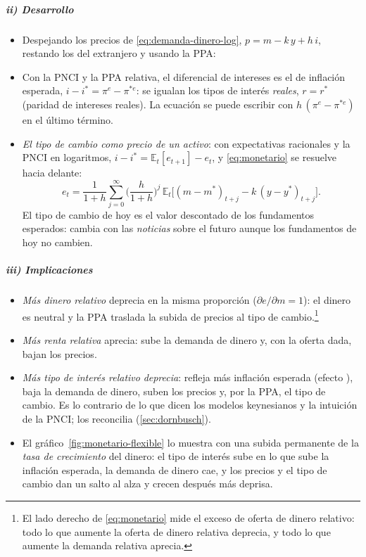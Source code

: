 \documentclass[11pt]{article}
\begin{document}
\subparagraph{ii) Desarrollo}
\begin{itemize}
\item Despejando los precios de \eqref{eq:demanda-dinero-log}, $p=m-k\,y+h\,i$, restando los del extranjero y usando la PPA:
\item Con la PNCI y la PPA relativa, el diferencial de intereses es el de inflación esperada, $i-i^*=\pi^e-\pi^{*e}$: se igualan los tipos de interés \emph{reales}, $r=r^*$ (paridad de intereses reales). La ecuación se puede escribir con $h\,(\pi^e-\pi^{*e})$ en el último término.
\item \emph{El tipo de cambio como precio de un activo}: con expectativas racionales  y la PNCI en logaritmos, $i-i^*=\mathbb{E}_t[e_{t+1}]-e_t$, y \eqref{eq:monetario} se resuelve hacia delante:
  \begin{equation}\label{eq:valor-presente}
  e_t=\frac{1}{1+h}\sum_{j=0}^{\infty}\Big(\frac{h}{1+h}\Big)^{j}\,\mathbb{E}_t\big[(m-m^*)_{t+j}-k\,(y-y^*)_{t+j}\big] .
  \end{equation}
  El tipo de cambio de hoy es el valor descontado de los fundamentos esperados: cambia con las \emph{noticias} sobre el futuro aunque los fundamentos de hoy no cambien\nocite{Mussa1976Exchange,Frenkel1981News}.
\end{itemize}

\subparagraph{iii) Implicaciones}
\begin{itemize}
\item \emph{Más dinero relativo} deprecia en la misma proporción ($\partial e/\partial m=1$): el dinero es neutral y la PPA traslada la subida de precios al tipo de cambio.\footnote{El lado derecho de \eqref{eq:monetario} mide el exceso de oferta de dinero relativo: todo lo que aumente la oferta de dinero relativa deprecia, y todo lo que aumente la demanda relativa aprecia.}
\item \emph{Más renta relativa} aprecia: sube la demanda de dinero y, con la oferta dada, bajan los precios.
\item \emph{Más tipo de interés relativo} \emph{deprecia}: refleja más inflación esperada (efecto ), baja la demanda de dinero, suben los precios y, por la PPA, el tipo de cambio. Es lo contrario de lo que dicen los modelos keynesianos y la intuición de la PNCI; \textcite{Frankel1979Mark} los reconcilia (\ref{sec:dornbusch}).
\item El gráfico~\ref{fig:monetario-flexible} lo muestra con una subida permanente de la \emph{tasa de crecimiento} del dinero: el tipo de interés sube en lo que sube la inflación esperada, la demanda de dinero cae, y los precios y el tipo de cambio dan un salto al alza y crecen después más deprisa.
\end{itemize}
\end{document}
